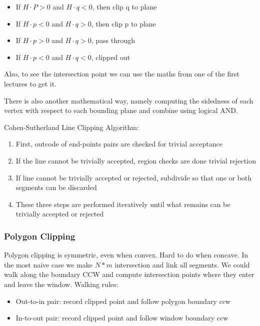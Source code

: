 \documentclass[11pt]{article}
\begin{document}
\begin{itemize}
    \item If $H\cdot P > 0$ and $ H\cdot q < 0$, then clip q to plane
    \item If $H\cdot p < 0$ and $H \cdot q > 0$, then clip p to plane
    \item If $H\cdot p > 0$ and $H \cdot q > 0$, pass through
    \item If $H\cdot p < 0$ and $H \cdot q < 0$, clipped out         
\end{itemize}

Also, to see the intersection point we can use the maths from one of the first lectures to get it.

There is also another mathematical way, namely computing the sidedness of each vertex with respect to each bounding plane and combine using logical AND. 

Cohen-Sutherland Line Clipping Algorithm:
\begin{enumerate}
    \item First, outcode of end-points pairs are checked for trivial acceptance
    \item If the line cannot be trivially accepted, region checks are done trivial rejection
    \item If line cannot be trivially accepted or rejected, subdivide so that one or both segments can be discarded
    \item These three steps are performed iteratively until what remains can be trivially accepted or rejected
\end{enumerate}


\subsubsection*{Polygon Clipping}
Polygon clipping is symmetric, even when convex. Hard to do when concave. In the most naive case we make $N*m$ intersection and link all segments. We could walk along the boundary CCW and compute intersection points where they enter and leave the window.
\newline
Walking rules: 
\begin{itemize}
    \item Out-to-in pair: record clipped point and follow polygon boundary ccw
    \item In-to-out pair: record clipped point and follow window boundary ccw
\end{itemize}
\end{document}
